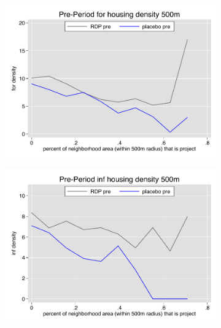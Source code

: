 \documentclass[12pt]{article}
\begin{document}
\begin{figure}
        \begin{subfigure}[b]{0.495\textwidth}
            \centering
            \includegraphics[width=\textwidth,trim={0.3cm .3cm 0.1cm 0cm}, clip=true]{figures/overlap_for_500_local_pre.pdf}
        \end{subfigure}
        \hfill
        \begin{subfigure}[b]{0.495\textwidth}  
            \centering 
            \includegraphics[width=\textwidth,trim={0.3cm .3cm 0.1cm 0cm}, clip=true]{figures/overlap_inf_500_local_pre.pdf}
        \end{subfigure}
        \vspace{-6mm}

\end{figure}
\end{document}
